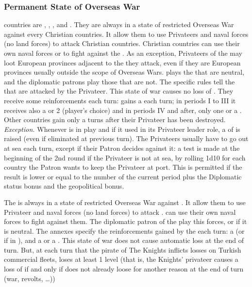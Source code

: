 \subsubsection{Permanent State of Overseas War}
\aparag[Barbaresques.]  countries are \paysCyrenaique,
\paysTripoli, \paysTunisie, \paysAlgerie and \paysMaroc. They are always in a
state of restricted Overseas War against every Christian countries.
\bparag It allow them to use Privateers and naval forces (no land forces) to
attack Christian countries. Christian countries can use their own naval forces
or \Presidios to fight against the .
\bparag As an exception, Privateers of the  may loot
European provinces adjacent to the \STZ they attack, even if they are European
provinces usually outside the scope of Overseas Wars.
\bparag \TUR plays the  that are neutral, and the
diplomatic patrons play those that are not. The specific rules tell the \STZ
that are attacked by the Privateer.
\bparag This state of war causes no loss of \STAB.
\bparag[Reinforcements] They receive some reinforcements each turn:
 gains a \corsaire\facemoins each turn; in periods I to III it
receives also a \ND or 2 \NGD (player's choice) and in periods IV and after,
only one \NGD or a \NDE. Other countries gain only a \corsaire{}
turns after their Privateer has been destroyed.
\bparag \textit{Exception.} Whenever  is in play and if it used
in its Privateer leader role, a \corsaire\facemoins of  is
raised (even if eliminated at previous turn).
 The Privateers usually have to go out at sea
each turn, except if their Patron decides against it: a test is made at the
beginning of the 2nd round if the Privateer is not at sea, by rolling 1d10 for
each country the Patron wants to keep the Privateer at port.  This is
permitted if the result is lower or equal to the number of the current period
plus the Diplomatic status bonus and the geopolitical bonus.

 The  is always in a state of restricted
Overseas War against \TUR.
\bparag It allow them to use Privateer and naval forces (no land forces) to
attack \TUR. \TUR can use their own naval forces to fight against them.
\bparag The diplomatic patron of the  play this forces, or
\SPA if it is neutral.
\bparag The annexes specify the reinforcements gained by the 
each turn: a \corsaire\facemoins (or \Faceplus if in ), and a
\NGD or a \NDE.
\bparag This state of war does not cause automatic \STAB loss at the end of
turn.  But, at each turn that the pirate of The Knights inflicts losses on
Turkish commercial fleets, \TUR loses at least 1 \STAB level (that is, the
Knights' privateer causes a loss of \STAB if and only if \TUR does not already
loose \STAB for another reason at the end of turn (war, revolts, \ldots))


